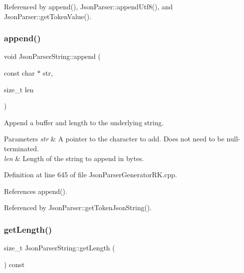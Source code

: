 Referenced by append(), Json\+Parser\+::append\+Utf8(), and Json\+Parser\+::get\+Token\+Value().

\mbox{\label{class_json_parser_string_a28e2858fe1481e20fa8bc40054378c9f}} 
\subsubsection{\texorpdfstring{append()}{append()}\hspace{0.1cm}{\footnotesize\ttfamily [2/2]}}
{\footnotesize\ttfamily void Json\+Parser\+String\+::append (\begin{DoxyParamCaption}\item[{const char $\ast$}]{str,  }\item[{size\+\_\+t}]{len }\end{DoxyParamCaption})}



Append a buffer and length to the underlying string. 


\begin{DoxyParams}{Parameters}
{\em str} & A pointer to the character to add. Does not need to be null-\/terminated.\\
\hline
{\em len} & Length of the string to append in bytes. \\
\hline
\end{DoxyParams}


Definition at line 645 of file Json\+Parser\+Generator\+R\+K.\+cpp.



References append().



Referenced by Json\+Parser\+::get\+Token\+Json\+String().

\mbox{\label{class_json_parser_string_a3a495e1fb69d2900fda8b0556c93e51c}} 
\subsubsection{\texorpdfstring{get\+Length()}{getLength()}}
{\footnotesize\ttfamily size\+\_\+t Json\+Parser\+String\+::get\+Length (\begin{DoxyParamCaption}{ }\end{DoxyParamCaption}) const\hspace{0.3cm}{\ttfamily [inline]}}




